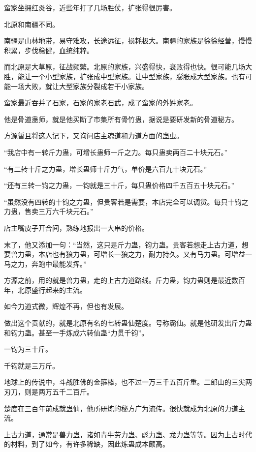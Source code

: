 
\begin{this_body}

蛮家坐拥红炎谷，近些年打了几场胜仗，扩张得很厉害。

北原和南疆不同。

南疆是山林地带，易守难攻，长途远征，损耗极大。南疆的家族是徐徐经营，慢慢积累，步伐稳健，血统纯粹。

而北原是大草原，征战频繁。北原的家族，兴盛得快，衰败得也快。很可能几场大胜，能让一个小型家族，扩张成中型家族。让中型家族，膨胀成大型家族。也有可能一场大败，就让大型家族分裂成若干小家族。

蛮家最近吞并了石家，石家的家老石武，成了蛮家的外姓家老。

他是骨道蛊师，就是他买断了市集所有骨竹蛊，据说是要研发新的骨道秘方。

方源暂且将这人记下，又询问店主魂道和力道方面的蛊虫。

“我店中有一转斤力蛊，可增长蛊师一斤之力。每只蛊卖两百二十块元石。”

“有二转十斤之力蛊，增长蛊师十斤力气，单价是六百九十块元石。”

“还有三转一钧之力蛊，一钧就是三十斤，每只蛊价格四千五百五十块元石。”

“虽然没有四转的十钧之力蛊，但贵客若是需要，本店完全可以调货。每只十钧之力蛊，售卖三万六千块元石。”

店主嘴皮子开合间，熟练地报出一大串的价格。

末了，他又添加一句：“当然，这只是斤力蛊，钧力蛊。贵客若想走上古力道，想要兽力蛊，本店也有狼力蛊，可增长一狼之力，耐力持久。又有马力蛊。可增益一马之力，奔跑中最能发挥。”

方源之前，用的就是兽力蛊，走的上古力道路线。斤力蛊，钧力蛊则是最近数百年，北原盛行起来的主流。

如今力道式微，辉煌不再，但也有发展。

做出这个贡献的，就是北原有名的七转蛊仙楚度。号称霸仙。就是他研发出斤力蛊和钧力蛊。甚至一手炼成六转仙蛊“力贯千钧”。

一钧为三十斤。

千钧就是三万斤。

地球上的传说中，斗战胜佛的金箍棒，也不过一万三千五百斤重。二郎山的三尖两刃刀，则是两万五千二百斤。

楚度在三百年前成就蛊仙，他所研炼的秘方广为流传。很快就成为北原的力道主流。

上古力道，通常是兽力蛊，诸如青牛劳力蛊、彪力蛊、龙力蛊等等。因为上古时代的材料，到了如今，有许多稀缺，因此炼蛊成本颇高。


\end{this_body}

